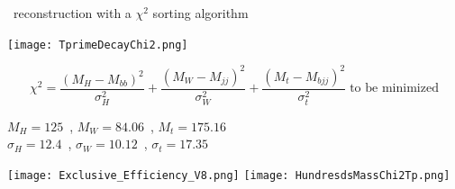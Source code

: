 \begin{frame}{\Tp~reconstruction with a $\chi^{2}$ sorting algorithm}
\vspace{-0.4cm}

\begin{center}
  \texttt{[image: TprimeDecayChi2.png]}
\end{center}

\vspace{-.5cm}
\tiny{
\begin{equation*}
\chi^{2}=\frac{(M_{H}-M_{bb})^{2}}{\sigma_{H}^{2}}+\frac{(M_{W}-M_{jj})^{2}}{\sigma_{W}^{2}}+\frac{(M_{t}-M_{bjj})^{2}}{\sigma_{t}^{2}}\; \text{to be minimized}
\end{equation*}
\vspace{-.2cm}
\begin{center}
$M_{H}=125$~\GeVcc, $M_{W}=84.06$~\GeVcc, $M_{t}=175.16$~\GeVcc\\
$\sigma_{H}=12.4$~\GeVcc, $\sigma_{W}=10.12$~\GeVcc, $\sigma_{t}=17.35$~\GeVcc
\end{center}
}%
\vspace{-.3cm}
\begin{center}
\texttt{[image: Exclusive\_Efficiency\_V8.png]}
\texttt{[image: HundresdsMassChi2Tp.png]}
\end{center}

\end{frame}


